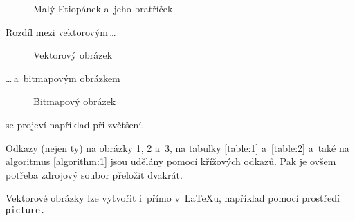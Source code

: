 \documentclass[a4paper, 11pt]{article}[23.3.2020]
\begin{document}
\begin{figure}[h]
	\centering
		\caption{Malý Etiopánek a~jeho bratříček}\label{figure:1}
\end{figure}
\newpage

Rozdíl mezi vektorovým\,\dots

\begin{figure}[h]
		\centering
		\caption{Vektorový obrázek}\label{figure:2}
\end{figure}

\noindent \dots\,a~bitmapovým obrázkem

\begin{figure}[h]
        \centering
		\caption{Bitmapový obrázek}\label{figure:3}
\end{figure}

\noindent se projeví například při zvětšení.

Odkazy (nejen ty) na obrázky \ref{figure:1}, \ref{figure:2} a~\ref{figure:3}, na tabulky \ref{table:1} a~\ref{table:2} a~také na algoritmus \ref{algorithm:1} jsou udělány pomocí křížových odkazů. Pak je ovšem potřeba zdrojový soubor přeložit dvakrát.

Vektorové obrázky lze vytvořit i~přímo v~\LaTeX u, například pomocí prostředí\verb| picture.|
\end{document}
